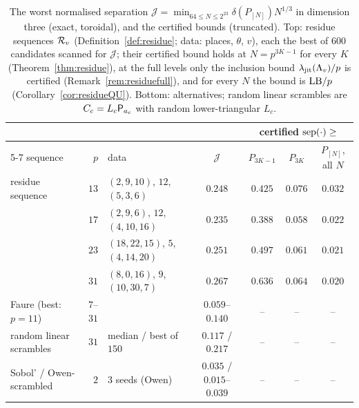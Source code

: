 \begin{table}[t]
\centering
\small
\caption{The worst normalised separation $\mathcal J=\min_{64\le N\le2^{23}}\delta(P_{[N]})N^{1/3}$ in dimension three (exact, toroidal), and the certified bounds (truncated). Top: residue sequences $\mathcal{R}_v$ (Definition~\ref{def:residue}; data: places, $\theta$, $v$), each the best of $600$ candidates scanned for $\mathcal J$; their certified bound holds at $N=p^{3K-1}$ for every $K$ (Theorem~\ref{thm:residue}), at the full levels only the inclusion bound $\lambda_{\mathrm{jit}}(\Lambda_v)/p$ is certified (Remark~\ref{rem:residuefull}), and for every $N$ the bound is $\mathrm{LB}/p$ (Corollary~\ref{cor:residueQU}). Bottom: alternatives; random linear scrambles are $C_c=L_c\mathsf{P}_{a_c}$ with random lower-triangular $L_c$.}
\label{tab:practice}
\setlength{\tabcolsep}{3pt}
\begin{tabular}{@{}l r l c ccc@{}}
\toprule
 & & & & \multicolumn{3}{c}{certified $\operatorname{sep}(\cdot)\ge$}\\
\cmidrule(l){5-7}
sequence & $p$ & data & $\mathcal J$ & $P_{3K-1}$ & $P_{3K}$ & $P_{[N]}$, all $N$\\
\midrule
residue sequence & $13$ & $(2,9,10)$, $12$, $(5,3,6)$ & $0.248$ & $0.425$ & $0.076$ & $0.032$\\
 & $17$ & $(2,9,6)$, $12$, $(4,10,16)$ & $0.235$ & $0.388$ & $0.058$ & $0.022$\\
 & $23$ & $(18,22,15)$, $5$, $(4,14,20)$ & $0.251$ & $0.497$ & $0.061$ & $0.021$\\
 & $31$ & $(8,0,16)$, $9$, $(10,30,7)$ & $0.267$ & $0.636$ & $0.064$ & $0.020$\\
\midrule
Faure (best: $p=11$) & $7$--$31$ & & $0.059$--$0.140$ & -- & -- & --\\
random linear scrambles & $31$ & median / best of $150$ & $0.117$ / $0.217$ & -- & -- & --\\
Sobol' / Owen-scrambled & $2$ & $3$ seeds (Owen) & $0.035$ / $0.015$--$0.039$ & -- & -- & --\\
\bottomrule
\end{tabular}
\end{table}

